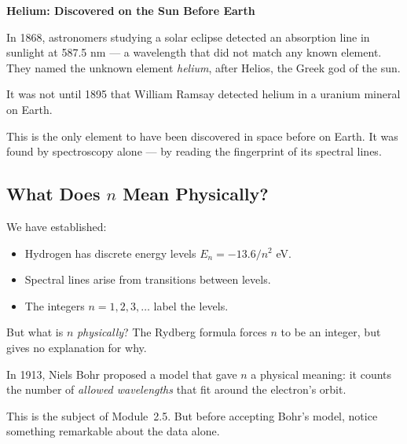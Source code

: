 \documentclass[12pt, a4paper]{book}
\begin{document}
\begin{historybox}
\textbf{Helium: Discovered on the Sun Before Earth}

In 1868, astronomers studying a solar eclipse detected
an absorption line in sunlight at 587.5 nm ---
a wavelength that did not match any known element.
They named the unknown element \emph{helium}, after Helios,
the Greek god of the sun.

It was not until 1895 that William Ramsay detected helium
in a uranium mineral on Earth.

This is the only element to have been discovered in
space before on Earth.
It was found by spectroscopy alone --- by reading the
fingerprint of its spectral lines.
\end{historybox}

\subsection{What Does $n$ Mean Physically?}

We have established:
\begin{itemize}[nosep, leftmargin=2em]
  \item Hydrogen has discrete energy levels $E_n = -13.6/n^2$ eV.
  \item Spectral lines arise from transitions between levels.
  \item The integers $n = 1, 2, 3, \ldots$ label the levels.
\end{itemize}

But what is $n$ \emph{physically}?
The Rydberg formula forces $n$ to be an integer,
but gives no explanation for why.

In 1913, Niels Bohr proposed a model that gave $n$
a physical meaning: it counts the number of
\emph{allowed wavelengths} that fit around the electron's orbit.

This is the subject of Module~2.5.
But before accepting Bohr's model, notice something remarkable
about the data alone.
\end{document}
